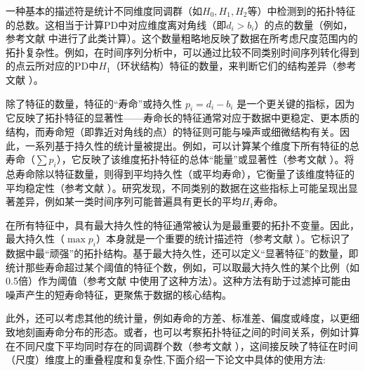             一种基本的描述符是统计不同维度同调群（如$H_0, H_1, H_2$等）中检测到的拓扑特征的总数。这相当于计算PD中对应维度离对角线（即$d_i > b_i$）的点的数量（例如，参考文献  中进行了此类计算）。这个数量粗略地反映了数据在所考虑尺度范围内的拓扑复杂性。例如，在时间序列分析中，可以通过比较不同类别时间序列转化得到的点云所对应的PD中$H_1$（环状结构）特征的数量，来判断它们的结构差异（参考文献 ）。
            
            除了特征的数量，特征的“寿命”或持久性 $p_i = d_i - b_i$ 是一个更关键的指标，因为它反映了拓扑特征的显著性——寿命长的特征通常对应于数据中更稳定、更本质的结构，而寿命短（即靠近对角线的点）的特征则可能与噪声或细微结构有关。因此，一系列基于持久性的统计量被提出。例如，可以计算某个维度下所有特征的总寿命（$\sum p_i$），它反映了该维度拓扑特征的总体“能量”或显著性（参考文献 ）。将总寿命除以特征数量，则得到平均持久性（或平均寿命），它衡量了该维度特征的平均稳定性（参考文献 ）。研究发现，不同类别的数据在这些指标上可能呈现出显著差异，例如某一类时间序列可能普遍具有更长的平均$H_1$寿命。
            
            在所有特征中，具有最大持久性的特征通常被认为是最重要的拓扑不变量。因此，最大持久性（$\max p_i$）本身就是一个重要的统计描述符（参考文献 ）。它标识了数据中最“顽强”的拓扑结构。基于最大持久性，还可以定义“显著特征”的数量，即统计那些寿命超过某个阈值的特征个数，例如，可以取最大持久性的某个比例（如0.5倍）作为阈值（参考文献  中使用了这种方法）。这种方法有助于过滤掉可能由噪声产生的短寿命特征，更聚焦于数据的核心结构。
            

            
            此外，还可以考虑其他的统计量，例如寿命的方差、标准差、偏度或峰度，以更细致地刻画寿命分布的形态。或者，也可以考察拓扑特征之间的时间关系，例如计算在不同尺度下平均同时存在的同调群个数（参考文献 ），这间接反映了特征在时间（尺度）维度上的重叠程度和复杂性,下面介绍一下论文中具体的使用方法:

